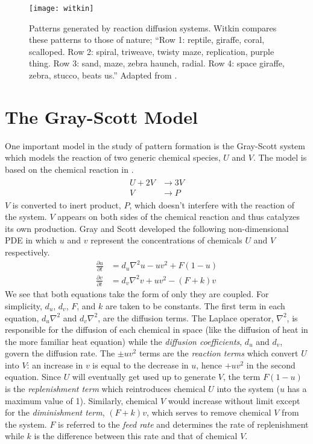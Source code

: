 \begin{figure}[h]
	\centering
	\texttt{[image: witkin]}
         \caption{Patterns generated by reaction diffusion systems. Witkin compares these patterns to those of nature; ``Row 1: reptile, giraffe, coral, scalloped. Row 2: spiral, triweave, twisty maze, replication, purple thing. Row 3: sand, maze, zebra haunch, radial. Row 4: space giraffe, zebra, stucco, beats us.'' Adapted from \protect{}.} \label{fig:witkin}
\end{figure}
	
\section{The Gray-Scott Model} \label{sect:gsmodel}
	One important model in the study of pattern formation is the Gray-Scott system which models the reaction of two generic chemical species, $U$ and $V$. The model is based on the chemical reaction in .
	\begin{align}
	\begin{split}
		U + 2V &\rightarrow 3V \\
		V &\rightarrow P
		\label{eq:gs-chem}
	\end{split}
	\end{align}
$V$ is converted to inert product, $P$, which doesn't interfere with the reaction of the system. $V$ appears on both sides of the chemical reaction and thus catalyzes its own production. Gray and Scott developed the following non-dimensional PDE in which $u$ and $v$ represent the concentrations of chemicals $U$ and $V$ respectively.
	\begin{align}\label{eq:gs}
		\frac{\partial u}{\partial t} & = d_u \nabla^2 u - uv^2 + F(1-u) \\
		\frac{\partial v}{\partial t} & = d_v \nabla^2 v  + uv^2 - (F +k)v
	\end{align}
We see that both equations take the form of  only they are coupled. For simplicity, $d_u$, $d_v$, $F$, and $k$ are taken to be constants. The first term in each equation, $d_u \nabla^2$ and $d_v \nabla^2$, are the diffusion terms. The Laplace operator, $\nabla^2$, is responsible for the diffusion of each chemical in space (like the diffusion of heat in the more familiar heat equation) while the \textit{diffusion coefficients}, $d_u$ and $d_v$, govern the diffusion rate. The $\pm uv^2$ terms are the  \textit{reaction terms} which convert $U$ into $V$: an increase in $v$ is equal to the decrease in $u$, hence $+uv^2$ in the second equation. Since $U$ will eventually get used up to generate $V$, the term $F(1-u)$ is the \textit{replenishment term} which reintroduces chemical $U$ into the system ($u$ has a maximum value of 1). Similarly, chemical $V$ would increase without limit except for the \textit{diminishment term}, $(F+k)v$, which serves to remove chemical $V$ from the system. $F$ is referred to the \textit{feed rate} and determines the rate of replenishment while $k$ is the difference between this rate and that of chemical $V$.

